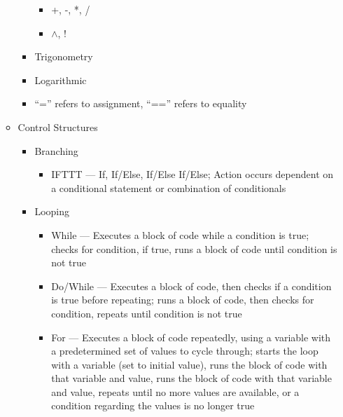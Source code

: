 \begin{itemize}
\begin{itemize}
\begin{itemize}
\begin{itemize}
              \item +, -, *, /

              \item $\wedge$, !

            \end{itemize}

          \item Trigonometry

          \item Logarithmic

          \item ``='' refers to assignment, ``=='' refers to equality

        \end{itemize}

      \item Control Structures

        \begin{itemize}

          \item Branching

            \begin{itemize}

              \item IFTTT — If, If/Else, If/Else If/Else; Action occurs dependent on a conditional statement or combination of conditionals

            \end{itemize}

          \item Looping

            \begin{itemize}

              \item While — Executes a block of code while a condition is true; checks for condition, if true, runs a block of code until condition is not true

              \item Do/While — Executes a block of code, then checks if a condition is true before repeating; runs a block of code, then checks for condition, repeats until condition is not true

              \item For — Executes a block of code repeatedly, using a variable with a predetermined set of values to cycle through; starts the loop with a variable (set to initial value), runs the block of code with that variable and value, runs the block of code with that variable and value, repeats until no more values are available, or a condition regarding the values is no longer true


\end{itemize}
\end{itemize}
\end{itemize}
\end{itemize}
